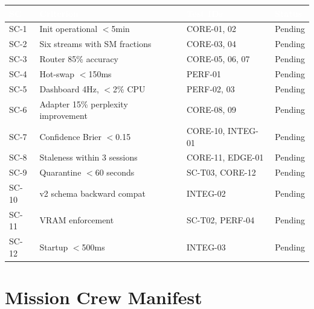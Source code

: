 \documentclass[11pt,letterpaper]{article}
\newcommand{\tableheader}[1]{\textbf{\sffamily\textcolor{white}{#1}}}
\begin{document}
\begin{center}
\begin{tabularx}{\textwidth}{C{1cm}L{5cm}L{2cm}C{1.5cm}}
\toprule
{}
\tableheader{SC} & \tableheader{Criterion} & \tableheader{Test IDs} & \tableheader{Status} \\
\midrule
SC-1 & Init operational $<$5min & CORE-01, 02 & Pending \\
SC-2 & Six streams with SM fractions & CORE-03, 04 & Pending \\
SC-3 & Router 85\% accuracy & CORE-05, 06, 07 & Pending \\
SC-4 & Hot-swap $<$150ms & PERF-01 & Pending \\
SC-5 & Dashboard 4Hz, $<$2\% CPU & PERF-02, 03 & Pending \\
SC-6 & Adapter 15\% perplexity improvement & CORE-08, 09 & Pending \\
SC-7 & Confidence Brier $<$0.15 & CORE-10, INTEG-01 & Pending \\
SC-8 & Staleness within 3 sessions & CORE-11, EDGE-01 & Pending \\
SC-9 & Quarantine $<$60 seconds & SC-T03, CORE-12 & Pending \\
SC-10 & v2 schema backward compat & INTEG-02 & Pending \\
SC-11 & VRAM enforcement & SC-T02, PERF-04 & Pending \\
SC-12 & Startup $<$500ms & INTEG-03 & Pending \\
\bottomrule
\end{tabularx}
\end{center}

\section{Mission Crew Manifest}
\end{document}
